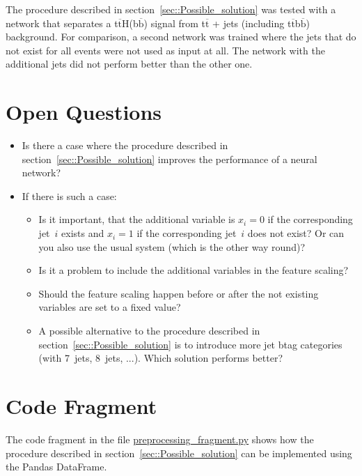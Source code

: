 \documentclass[12pt,a4paper]{article}
\begin{document}
The procedure described in section~\ref{sec::Possible_solution} was tested with a network that separates a t$\overline{\text{t}}$H(b$\overline{\text{b}}$) signal from t$\overline{\text{t}}$ + jets (including t$\overline{\text{t}}$b$\overline{\text{b}}$) background. For comparison, a second network was trained where the jets that do not exist for all events were not used as input at all. The network with the additional jets did not perform better than the other one.


\section{Open Questions}

\begin{itemize}
\item Is there a case where the procedure described in section~\ref{sec::Possible_solution} improves the performance of a neural network?
\item If there is such a case:
\begin{itemize}
\item Is it important, that the additional variable is $x_i = 0$ if the corresponding jet~$i$ exists and $x_i = 1$ if the corresponding jet~$i$ does not exist? Or can you also use the usual system (which is the other way round)?
\item Is it a problem to include the additional variables in the feature scaling?
\item Should the feature scaling happen before or after the not existing variables are set to a fixed value?
\item A possible alternative to the procedure described in section~\ref{sec::Possible_solution} is to introduce more jet btag categories (with 7~jets, 8~jets, ...). Which solution performs better?
\end{itemize}
\end{itemize}


\section{Code Fragment}

The code fragment in the file \url{preprocessing_fragment.py} shows how the procedure described in section~\ref{sec::Possible_solution} can be implemented using the Pandas DataFrame.
\end{document}

